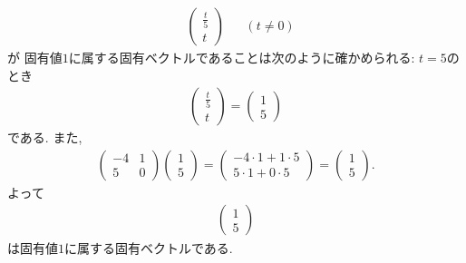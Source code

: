 \begin{checkanswer}%
  \begin{align*}
    &\begin{pmatrix}\frac{t}{5}\\t\end{pmatrix}
       &&(t\neq 0)
  \end{align*}
  が
  固有値$1$に属する固有ベクトルであることは次のように確かめられる:
  $t=5$のとき
  \begin{align*}
    \begin{pmatrix}\frac{t}{5}\\t\end{pmatrix}=\begin{pmatrix}1\\5\end{pmatrix}
  \end{align*}
  である.
  また,
  \begin{align*}
    \begin{pmatrix}-4&1\\5&0\end{pmatrix}\begin{pmatrix}1\\5\end{pmatrix}
   =\begin{pmatrix}-4\cdot 1+1\cdot 5\\5\cdot1+0\cdot5\end{pmatrix}
   =\begin{pmatrix}1\\5\end{pmatrix}.    
  \end{align*}
  よって
  \begin{align*}
    \begin{pmatrix}1\\5\end{pmatrix}
  \end{align*}
  は固有値$1$に属する固有ベクトルである.
\end{checkanswer}
